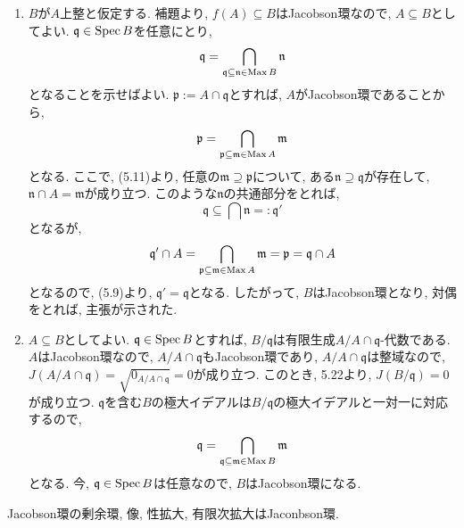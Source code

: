 \documentclass[dvipdfmx]{jsarticle}
\begin{document}
    \begin{problem}
        \begin{enumerate}
            \item $B$が$A$上整と仮定する.
            補題より, $f(A) \subseteq B$はJacobson環なので, $A \subseteq B$としてよい.
            $\mathfrak{q} \in \operatorname{Spec}{B}$を任意にとり,
            \[
                \mathfrak{q} = \bigcap_{\mathfrak{q} \subseteq \mathfrak{n} \in \operatorname{Max}{B}} \mathfrak{n}
            \]
            となることを示せばよい.
            $\mathfrak{p} := A \cap \mathfrak{q}$とすれば,
            $A$がJacobson環であることから,
            \[
                \mathfrak{p} = \bigcap_{\mathfrak{p} \subseteq \mathfrak{m} \in \operatorname{Max}{A}} \mathfrak{m}
            \]
            となる.
            ここで,
            (5.11)より,
            任意の$\mathfrak{m} \supseteq \mathfrak{p}$について,
            ある$\mathfrak{n} \supseteq \mathfrak{q}$が存在して, $\mathfrak{n} \cap A = \mathfrak{m}$が成り立つ.
            このような$\mathfrak{n}$の共通部分をとれば,
            \[
                \mathfrak{q} \subseteq \bigcap \mathfrak{n} =: \mathfrak{q}'
            \]
            となるが,
            \[
                \mathfrak{q}' \cap A  = \bigcap_{\mathfrak{p} \subseteq \mathfrak{m} \in \operatorname{Max}{A}} \mathfrak{m} = \mathfrak{p} = \mathfrak{q} \cap A
            \]
            となるので, (5.9)より,
            $\mathfrak{q}' = \mathfrak{q}$となる.
            したがって, $B$はJacobson環となり, 対偶をとれば, 主張が示された.
            \item $A \subseteq B$としてよい.
            $\mathfrak{q} \in \operatorname{Spec}{B}$とすれば, $B /\mathfrak{q}$は有限生成$A/A \cap \mathfrak{q}$-代数である.
            $A$はJacobson環なので, $A/A \cap \mathfrak{q}$もJacobson環であり,
            $A/A \cap \mathfrak{q}$は整域なので,
            $J(A/A\cap\mathfrak{q}) = \sqrt{0_{A/A\cap\mathfrak{q}}} = 0$が成り立つ.
            このとき, 5.22より, $J(B/\mathfrak{q}) = 0$が成り立つ.
            $\mathfrak{q}$を含む$B$の極大イデアルは$B/\mathfrak{q}$の極大イデアルと一対一に対応するので,
            \[
                \mathfrak{q} = \bigcap_{\mathfrak{q} \subseteq \mathfrak{m} \in \operatorname{Max}{B}} \mathfrak{m}
            \]
            となる.
            今, $\mathfrak{q} \in \operatorname{Spec}{B}$は任意なので,
            $B$はJacobson環になる.
        \end{enumerate}
    \end{problem}

    \begin{note}
        Jacobson環の剰余環, 像, 性拡大, 有限次拡大はJaconbson環.
    \end{note}
\end{document}
